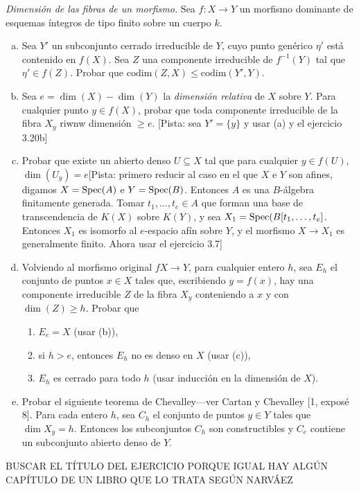 \documentclass[twoside]{article}
\begin{document}
\begin{ejercicio}{3.22}\emph{Dimensión de las fibras de un morfismo.} Sea $f:X\to Y$ un morfismo dominante de esquemas íntegros de tipo finito sobre un cuerpo $k$. 
\begin{enumerate}[(a)]
\item Sea $Y'$ un subconjunto cerrado irreducible de $Y$, cuyo punto genérico $\eta'$ está contenido en $f(X)$. Sea $Z$ una componente irreducible de $f^{-1}(Y)$ tal que $\eta'\in f(Z)$. Probar que $\mathrm{codim}(Z,X)\leq \mathrm{codim}(Y',Y)$. 
\item Sea $e=\dim(X)-\dim(Y)$ la \emph{dimensión relativa} de $X$ sobre $Y$. Para cualquier punto $y\in f(X)$, probar que toda componente irreducible de la fibra $X_y$ riwnw dimensión $\geq e$. [Pista: sea $Y'=\overline{\{y\}}$ y usar (a) y el ejercicio 3.20b]
\item Probar que existe un abierto denso $U\subseteq X$ tal que para cualquier $y\in f(U)$, $\dim(U_y)=e$[Pista: primero reducir al caso en el que $X$ e $Y$ son afines, digamos $X=\operatorname{Spec}(A)$ e $Y=\operatorname{Spec}(B)$. Entonces $A$ es una $B$-álgebra finitamente generada. Tomar $t_1,\dots, t_e\in A$ que forman una base de transcendencia de $K(X)$ sobre $K(Y)$, y sea $X_1=\operatorname{Spec}(B[t_1,\dots, t_e]$. Entonces $X_1$ es isomorfo al $e$-espacio afín sobre $Y$, y el morfismo $X\to X_1$ es generalmente finito. Ahora usar el ejercicio 3.7]
\item Volviendo al morfismo original $fX\to Y$, para cualquier entero $h$, sea $E_h$ el conjunto de puntos $x\in X$ tales que, escribiendo $y=f(x)$, hay una componente irreducible $Z$ de la fibra $X_y$ conteniendo a $x$ y con $\dim(Z)\geq h$. Probar que
\begin{enumerate}
\item $E_e=X$ (usar (b)),
\item si $h>e$, entonces $E_h$ no es denso en $X$ (usar (c)),
\item $E_h$ es cerrado para todo $h$ (usar inducción en la dimensión de $X$).
\end{enumerate}
\item Probar el siguiente teorema de Chevalley---ver Cartan y Chevalley [1, exposé 8]. Para cada entero $h$, sea $C_h$ el conjunto de puntos $y\in Y$ tales que $\dim X_y=h$. Entonces los subconjuntos $C_h$ son constructibles y $C_e$ contiene un subconjunto abierto denso de $Y$.
\end{enumerate}

\end{ejercicio}
\begin{solucion}
BUSCAR EL TÍTULO DEL EJERCICIO PORQUE IGUAL HAY ALGÚN CAPÍTULO DE UN LIBRO QUE LO TRATA SEGÚN NARVÁEZ
\end{solucion}
\end{document}
